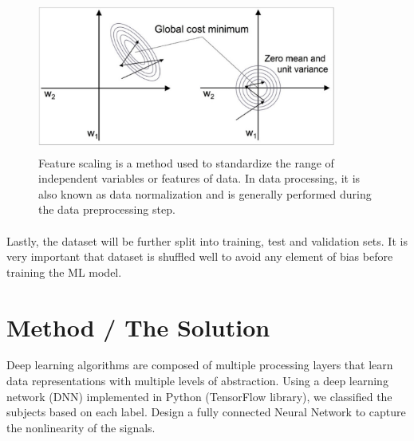 \documentclass{llncs}       %
\begin{document}
\begin{figure}[h]
\centering
\includegraphics[width=9.81cm,height=5.00cm]{media/image7.eps}
\caption{Feature scaling is a method used to standardize the 
range of independent variables or features of data. In data processing, 
it is also known as data normalization and is generally performed during 
the data preprocessing step.}
\end{figure}

\paragraph{}
\paragraph{}
\paragraph{}

Lastly, the dataset will be further split into training, test and validation sets. It is very important that dataset is shuffled well to avoid any element of bias before training the ML model.

\paragraph{}
\paragraph{}
\paragraph{}

\section{Method / The Solution}
\label{sec:3}
Deep learning algorithms are composed of multiple processing layers that learn data representations with multiple levels of abstraction. Using a deep learning network (DNN) implemented in Python (TensorFlow library), we classified the subjects based on each label.  Design a fully connected Neural Network to capture the nonlinearity of the signals.
 
\end{document}
